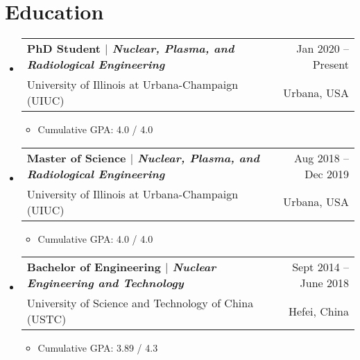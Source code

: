 \documentclass[letterpaper,11pt]{article} %
\makeatletter
\newcommand{\CVItem}[1]{
  \item\small{
    {#1 \vspace{-2pt}}
  }
}
\newcommand{\CVSubheading}[4]{
  \vspace{-2pt}\item
    \begin{tabular*}{0.97\textwidth}[t]{l@{\extracolsep{\fill}}r}
      \textbf{#1} & #2 \\
      \small#3 & \small #4 \\
    \end{tabular*}\vspace{-7pt}
}
\newcommand{\CVSubHeadingListStart}{\begin{itemize}[leftmargin=0.5cm, label={}]}
\newcommand{\CVSubHeadingListEnd}{\end{itemize}}
\newcommand{\CVItemListStart}{\begin{itemize}}
\newcommand{\CVItemListEnd}{\end{itemize}\vspace{-5pt}}
\makeatother
\begin{document}
\begin{comment}
This CV was written for specifically for positions I was applying for in
academia, and then modified to be a template.

A standard CV is about two pages long where as a resume in the US is one page.
sections can be added and removed here with this in mind. In my experience, 
education, and applicable work experience and skills are the most import things
to include on a resume. For a CV the Europass CV suggests the categories: Work
Experience, Education and Training, Language Skills, Digital Skills,
Communication and Interpersonal Skills, Conferences and Seminars, Creative Works
Driver's License, Hobbies and Interests, Honors and Awards, Management and
Leadership Skills, Networks and Memberships, Organizational Skills, Projects,
Publications, Recommendations, Social and Political Activities, Volunteering.

Your goal is to convey a who, what , when, where, why for every item you share. 
The who is obviously you, but I believe the rest should be done in that order.
For example below. An employer cares most about the degree held and typically 
less about the institution or where it is located (This is still good 
information though). Whatever order you choose be consistent throughout.
\end{comment}

\section{Education}
  \CVSubHeadingListStart
    \CVSubheading
      {{PhD Student $|$ \emph{\small{Nuclear, Plasma, and Radiological Engineering}}}}{Jan 2020 -- Present}
      {University of Illinois at Urbana-Champaign (UIUC)}{Urbana, USA}
      \CVItemListStart
        \CVItem{Cumulative GPA:  4.0 / 4.0}
      \CVItemListEnd
    \CVSubheading
      {{Master of Science $|$ \emph{\small{Nuclear, Plasma, and Radiological Engineering}}}}{Aug 2018 -- Dec 2019}
      {University of Illinois at Urbana-Champaign (UIUC)}{Urbana, USA}
       \CVItemListStart
        \CVItem{Cumulative GPA:  4.0 / 4.0}
      \CVItemListEnd
    \CVSubheading
      {{Bachelor of Engineering $|$ \emph{\small{Nuclear Engineering and Technology}}}}{Sept 2014 -- June 2018}
      {University of Science and Technology of China (USTC)}{Hefei, China}
       \CVItemListStart
        \CVItem{Cumulative GPA:  3.89 / 4.3}
      \CVItemListEnd
  \CVSubHeadingListEnd
\end{document}
